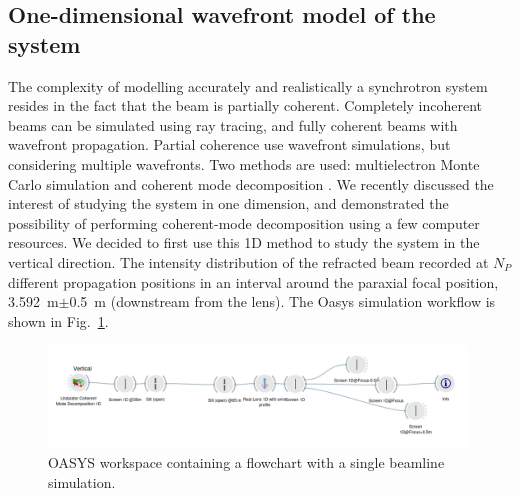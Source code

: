 \documentclass{iucr}
\newcommand{\todo}[1]{{\color{red}[TODO: "#1'']}}
\begin{document}
\subsection{One-dimensional wavefront model of the system}\label{sec:descriptionsystem}
The complexity of modelling accurately and realistically a synchrotron system resides in the fact that the beam is partially coherent. Completely incoherent beams can be simulated using ray tracing, and fully coherent beams with wavefront propagation. Partial coherence use wavefront simulations, but considering multiple wavefronts. Two methods are used: multielectron Monte Carlo simulation \cite{codeSRW_ME} and coherent mode decomposition \cite{Glass2017}. We recently discussed the interest of studying the system in one dimension, and demonstrated the possibility of performing coherent-mode decomposition \cite{multioptics}  using a few computer resources. We decided to first use this 1D method to study the system in the vertical direction. 
The intensity distribution of the refracted beam recorded at $N_P$ different propagation positions in an interval around the paraxial focal position, \SI{3.592}{\meter}$\pm$\SI{0.5}{\meter} (downstream from the lens). The Oasys \cite{codeOASYS} simulation workflow is shown in Fig.~\ref{fig:oasys}. 

\begin{figure}\label{fig:oasys}
    \includegraphics[width=0.99\textwidth]{figures/oasys.png}
    \caption{OASYS workspace containing a flowchart with a single beamline simulation. 
    }
\end{figure}
\end{document}
